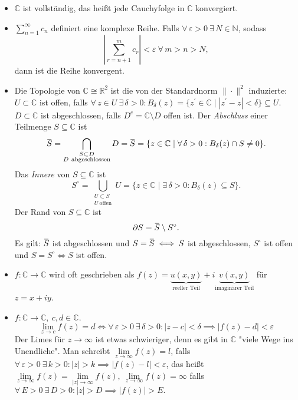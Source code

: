 \documentclass[a4paper,12pt]{book}
\renewcommand{\epsilon}{\varepsilon}
\theoremstyle{newthm}
\theoremstyle{newdef}
\theoremstyle{newrem}
\newcommand{\N}{\mathbb{N}}
\newcommand{\R}{\mathbb{R}}
\newcommand{\C}{\mathbb{C}}
\newcommand{\del}{\partial}
\newcommand{\overbar}[1]{\mkern 1.5mu\overline{\mkern-1.5mu#1\mkern-1.5mu}\mkern 1.5mu}
\begin{document}
		\begin{itemize}
			\item $\C$ ist vollständig, das heißt jede Cauchyfolge in $\C$ konvergiert.
			
			\item $ \sum_{n=1}^{\infty} c_n $ definiert eine komplexe Reihe. Falls $ \forall \, \epsilon > 0 \ \exists \, N \in \N $, sodass 
			$$ \left| \sum_{r=n+1}^{m} c_r \right| < \epsilon\ \forall\, m>n>N, $$
			dann ist die Reihe konvergent.
			
			\item Die Topologie von $ \C \cong \R^2 $ ist die von der Standardnorm $ \|\cdot\|^2 $ induzierte:\\
			$ U \subset \C $ ist offen, falls $ \forall\, z \in U \ \exists\, \delta > 0: B_\delta(z) = \{z^\prime \in \C \mid |z^\prime-z| < \delta \} \subseteq U $. $ D \subset \C $ ist abgeschlossen, falls $ D^c = \C \setminus D $ offen ist. Der \emph{Abschluss} einer Teilmenge $ S \subseteq \C $ ist 
			$$ \overbar{S} = \bigcap_{\substack{S \subset D\\D\ \text{abgeschlossen}}} D = \overbar{S} = \{ z \in \C \mid \forall\, \delta > 0: B_\delta(z) \cap S \neq 0 \}. $$
			Das \emph{Innere} von $ S \subseteq \C $ ist 
			$$ S^\circ = \bigcup_{\substack{U \subset S\\U\ \text{offen}}} U = \{ z \in \C\mid \exists\, \delta>0: B_\delta(z) \subseteq S \}. $$
			Der Rand von $ S \subseteq \C $ ist
			\[ \del S = \overbar{S}\setminus S^\circ. \]
			Es gilt: $ \overbar{S} $ ist abgeschlossen und $ S = \overbar{S} \iff S $ ist abgeschlossen, $ S^\circ $ ist offen und $ S = S^\circ \iff S $ ist offen.
			
			\item $ f: \C \to \C $ wird oft geschrieben als $ f(z) = \underbrace{u(x,y)}_{\text{reeller Teil}} + i\underbrace{v(x,y)}_{\text{imaginärer Teil}} $ für $ z = x+iy $.
			
			\item $ f: \C \to \C,\ c,d \in \C $. 
			$$ \lim_{z \to c} f(z) = d \iff \forall\, \epsilon > 0 \ \exists\, \delta >0: |z-c| < \delta \implies |f(z)-d|<\epsilon $$
			Der Limes für $ z \to \infty $ ist etwas schwieriger, denn es gibt in $\C$ "viele Wege ins Unendliche". Man schreibt $ \lim\limits_{z \to \infty} f(z) = l $, falls $ \forall \, \epsilon > 0 \ \exists\, k>0: |z|>k \implies |f(z)-l|<\epsilon $, das heißt $ \lim\limits_{z \to \infty} f(z) = \lim\limits_{|z| \to \infty} f(z),\ \lim\limits_{z \to \infty} f(z) = \infty $ falls $ \forall\, E>0 \ \exists\, D>0: |z|>D \implies |f(z)|>E. $
			

\end{itemize}
\end{document}
